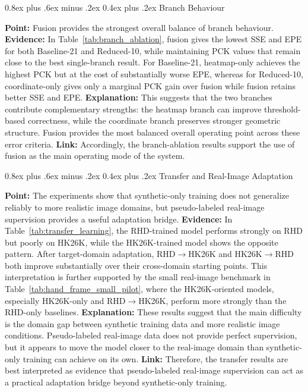 \documentclass[10pt,letterpaper]{article}
\makeatletter
\renewcommand\subsubsection{\@startsection{subsubsection}{3}{\z@}%
  {0.8ex plus .6ex minus .2ex}%
  {0.4ex plus .2ex}%
  {\normalfont\small\itshape}}
\makeatother
\begin{document}
\subsubsection{Branch Behaviour}

\medskip
\noindent\textbf{Point:} Fusion provides the strongest overall balance of branch behaviour.  
\textbf{Evidence:} In Table~\ref{tab:branch_ablation}, fusion gives the lowest SSE and EPE for both Baseline-21 and Reduced-10, while maintaining PCK values that remain close to the best single-branch result. For Baseline-21, heatmap-only achieves the highest PCK but at the cost of substantially worse EPE, whereas for Reduced-10, coordinate-only gives only a marginal PCK gain over fusion while fusion retains better SSE and EPE.  
\textbf{Explanation:} This suggests that the two branches contribute complementary strengths: the heatmap branch can improve threshold-based correctness, while the coordinate branch preserves stronger geometric structure. Fusion provides the most balanced overall operating point across these error criteria.  
\textbf{Link:} Accordingly, the branch-ablation results support the use of fusion as the main operating mode of the system.

\subsubsection{Transfer and Real-Image Adaptation}

\medskip
\noindent\textbf{Point:} The experiments show that synthetic-only training does not generalize reliably to more realistic image domains, but pseudo-labeled real-image supervision provides a useful adaptation bridge.  
\textbf{Evidence:} In Table~\ref{tab:transfer_learning}, the RHD-trained model performs strongly on RHD but poorly on HK26K, while the HK26K-trained model shows the opposite pattern. After target-domain adaptation, RHD$\rightarrow$HK26K and HK26K$\rightarrow$RHD both improve substantially over their cross-domain starting points. This interpretation is further supported by the small real-image benchmark in Table~\ref{tab:hand_frame_small_pilot}, where the HK26K-oriented models, especially HK26K-only and RHD$\rightarrow$HK26K, perform more strongly than the RHD-only baselines.  
\textbf{Explanation:} These results suggest that the main difficulty is the domain gap between synthetic training data and more realistic image conditions. Pseudo-labeled real-image data does not provide perfect supervision, but it appears to move the model closer to the real-image domain than synthetic-only training can achieve on its own.  
\textbf{Link:} Therefore, the transfer results are best interpreted as evidence that pseudo-labeled real-image supervision can act as a practical adaptation bridge beyond synthetic-only training.
\end{document}
